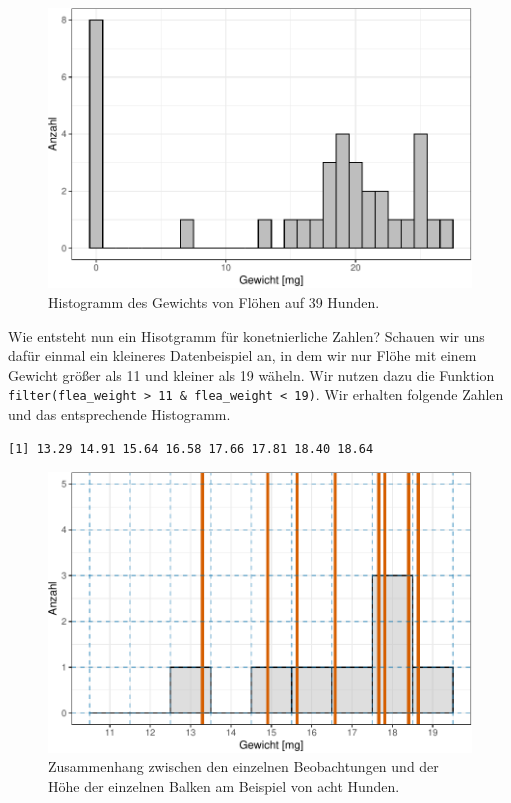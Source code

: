 \documentclass[
  letterpaper,
]{scrbook}
\begin{document}
\begin{figure}[H]

{\centering \includegraphics{./eda-ggplot_files/figure-pdf/fig-hist-flea-1-1.pdf}

}

\caption{\label{fig-hist-flea-1}Histogramm des Gewichts von Flöhen auf
39 Hunden.}

\end{figure}

Wie entsteht nun ein Hisotgramm für konetnierliche Zahlen? Schauen wir
uns dafür einmal ein kleineres Datenbeispiel an, in dem wir nur Flöhe
mit einem Gewicht größer als 11 und kleiner als 19 wäheln. Wir nutzen
dazu die Funktion
\texttt{filter(flea\_weight\ \textgreater{}\ 11\ \&\ flea\_weight\ \textless{}\ 19)}.
Wir erhalten folgende Zahlen und das entsprechende Histogramm.

\begin{verbatim}
[1] 13.29 14.91 15.64 16.58 17.66 17.81 18.40 18.64
\end{verbatim}

\begin{figure}

{\centering \includegraphics{./eda-ggplot_files/figure-pdf/fig-hist-flea-2-1.pdf}

}

\caption{\label{fig-hist-flea-2}Zusammenhang zwischen den einzelnen
Beobachtungen und der Höhe der einzelnen Balken am Beispiel von acht
Hunden.}

\end{figure}
\end{document}
